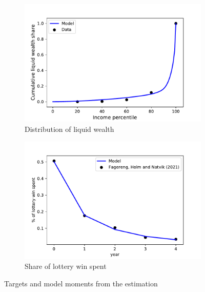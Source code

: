\documentclass[11pt]{article}
\begin{document}
	\begin{figure}[htb]
		\centering
		\begin{subfigure}[b]{.5\linewidth}
			\centering
			\includegraphics[width=\linewidth]{../Code/HA-Models/Target_AggMPCX_LiquWealth/Figures/LiquWealth_Distribution}
			\caption{Distribution of liquid wealth}
			\label{fig:liquwealthdistribution}
		\end{subfigure}%
		\begin{subfigure}[b]{.5\linewidth}
				\centering
			\includegraphics[width=\linewidth]{../Code/HA-Models/Target_AggMPCX_LiquWealth/Figures/AggMPC_LotteryWin}
			\caption{Share of lottery win spent}
			\label{fig:aggmpclotterywin}
		\end{subfigure}
		\caption{Targets and model moments from the estimation}
		\label{fig:splurge_estimation}
	\end{figure}
\end{document}
